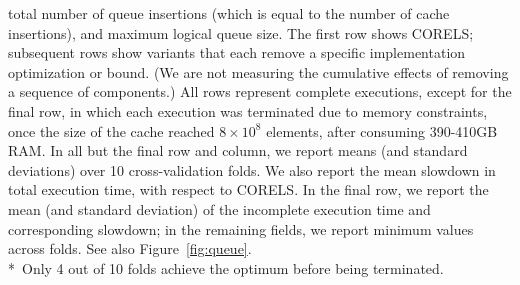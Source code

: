 \begin{table}[t!]
{total number of queue insertions (which is equal to the number of cache insertions),
and maximum logical queue size.
%
The first row shows CORELS; subsequent rows show variants
that each remove a specific implementation optimization or bound.
%
(We are not measuring the cumulative effects of removing a sequence of components.)
%
All rows represent complete executions, except for the final row,
in which each execution was terminated due to memory constraints,
once the size of the cache reached ${8 \times 10^8}$ elements,
after consuming 390-410GB RAM.
%
In all but the final row and column, we report means
(and standard deviations) over 10 cross-validation folds.
%
We also report the  mean slowdown in total execution time,
with respect to CORELS.
%
In the final row, we report the mean (and standard deviation) of the
incomplete execution time and corresponding slowdown;
in the remaining fields, we report minimum values across folds.
%
See also Figure~\ref{fig:queue}. \\
%
*~Only 4 out of 10 folds achieve the optimum before being terminated.
}
\vspace{4mm}
\label{tab:ablation}
\end{table}

